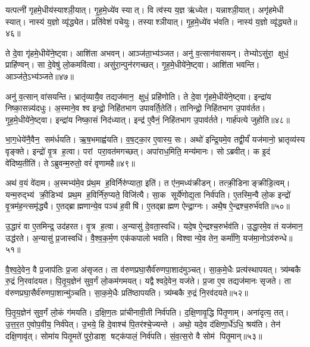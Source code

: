 यत्पत्नी॑ गृहमे॒धीय॑स्याश्ञी॒यात्।
गृ॒ह॒मे॒ध्ये॑व स्यात्।
वि त्व॑स्य य॒ज्ञ ऋ॑ध्येत।
यन्नाश्ञी॒यात्।
अगृ॑हमेधी स्यात्।
नास्य॑ य॒ज्ञो व्यृ॑द्ध्येत।
प्रति॑वेशं पचेयुः।
तस्याश्ञीयात्।
गृ॒ह॒मे॒ध्ये॑व भ॑वति।
नास्य॑ य॒ज्ञो व्यृ॑द्ध्यते॥४६॥

ते दे॒वा गृ॑हमे॒धीये॑ने॒ष्ट्वा।
आशि॑ता अभवन्।
आञ्ज॑ता॒भ्य॑ञ्जत।
अनु॑ व॒त्सान॑वासयन्।
तेभ्योऽसु॑रा॒ क्षुधं॒ प्राहि॑ण्वन्।
सा दे॒वेषु॑ लो॒कमवि॑त्वा।
असु॑रा॒न्पुन॑रगच्छत्।
गृ॒ह॒मे॒धीये॑ने॒ष्ट्वा।
आशि॑ता भवन्ति।
आञ्ज॑ते॒ऽभ्य॑ञ्जते॥४७॥

अनु॑ व॒त्सान् वा॑सयन्ति।
भ्रातृ॑व्यायै॒व तद्यज॑मान॒ क्षुधं॒ प्रहि॑णोति।
ते दे॒वा गृ॑हमे॒धीये॑ने॒ष्ट्वा।
इन्द्रा॑य निष्का॒सन्न्य॑दधुः।
अ॒स्माने॒व श्व इन्द्रो॒ निहि॑तभाग उपावर्ति॒तेति॑।
तानिन्द्रो॒ निहि॑तभाग उ॒पाव॑र्तत।
गृ॒ह॒मे॒धीये॑ने॒ष्ट्वा।
इन्द्रा॑य निष्का॒सं निद॑ध्यात्।
इन्द्र॑ ए॒वैनं॒ निहि॑तभाग उ॒पाव॑र्तते।
गार्\mbox{}ह॑पत्ये जुहोति॥४८॥

भा॒ग॒धेये॑नै॒वैन॒ सम॑र्धयति।
ऋ॒ष॒भमाह्व॑यति।
व॒ष॒ट्का॒र ए॒वास्य॒ सः।
अथो॑ इन्द्रि॒यमे॒व तद्वी॒र्यं॑ यज॑मानो॒ भ्रातृव्य॑स्य वृङ्क्ते।
इन्द्रो॑ वृ॒त्र ह॒त्वा।
परां परा॒वत॑मगच्छत्।
अपा॑राध॒मिति॒ मन्य॑मानः।
सोऽब्रवीत्।
क इ॒दं वे॑दिष्य॒तीति॑।
तेऽब्रुवन्म॒रुतो॒ वरं॑ वृणामहै॥४९॥

अथ॑ व॒यं वे॑दाम।
अ॒स्मभ्य॑मे॒व प्र॑थ॒म ह॒विर्निरु॑प्याता॒ इति॑।
त ए॑न॒मध्य॑क्रीडन्।
तत्क्री॒डिनाङ्क्रीडि॒त्वम्।
यन्म॒रुद्भ्य॑ क्री॒डिभ्य॑ प्रथ॒म ह॒विर्नि॑रु॒प्यते॒ विजि॑त्यै।
सा॒क सूर्ये॑णोद्य॒ता निर्व॑पति।
ए॒तस्मि॒न्वै लो॒क इन्द्रो॑ वृ॒त्रम॑ह॒न्त्समृ॑द्ध्यै।
ए॒तद्ब्राह्मणान्ये॒व पञ्च॑ ह॒वीषि॑।
ए॒तद्ब्राह्मण ऐन्द्रा॒ग्नः।
अथै॒ष ऐ॒न्द्रश्च॒रुर्भ॑वति॥५०॥

उ॒द्धारं वा ए॒तमिन्द्र॒ उद॑हरत।
वृ॒त्र ह॒त्वा।
अ॒न्यासु॑ दे॒वता॒स्वधि॑।
यदे॒ष ऐ॒न्द्रश्च॒रुर्भव॑ति।
उ॒द्धा॒रमे॒व तं यज॑मान॒ उद्ध॑रते।
अ॒न्यासु॑ प्र॒जास्वधि॑।
वै॒श्व॒क॒र्म॒ण एक॑कपालो भवति।
विश्वान्ये॒व तेन॒ कर्मा॑णि॒ यज॑मा॒नोऽव॑रुन्धे॥५१॥\anuvakamend[ऋ॒द्ध्य॒ते॒ऽभ्य॑ञ्जते जुहोति वृणामहै भवत्य॒ष्टौ च॑]

वै॒श्व॒दे॒वेन॒ वै प्र॒जाप॑तिः प्र॒जा अ॑सृजत।
ता व॑रुणप्रघा॒सैर्व॑रुणपा॒शाद॑मुञ्चत्।
सा॒क॒मे॒धैः प्रत्य॑स्थापयत्।
त्र्य॑म्बकै रु॒द्रं नि॒रवा॑दयत।
पि॒तृ॒य॒ज्ञेन॑ सुव॒र्गं लो॒कम॑गमयत्।
यद्वैश्वदे॒वेन॒ यज॑ते।
प्र॒जा ए॒व तद्यज॑मानः सृजते।
ता व॑रुणप्रघा॒सैर्व॑रुणपा॒शान्मु॑ञ्चति।
सा॒क॒मे॒धैः प्रति॑ष्ठापयति।
त्र्य॑म्बकै रु॒द्रं नि॒रव॑दयते॥५२॥

पि॒तृ॒य॒ज्ञेन॑ सुव॒र्गं लो॒कं ग॑मयति।
द॒क्षि॒ण॒तः प्रा॑चीनावी॒ती निर्व॑पति।
द॒क्षि॒णावृ॒द्धि पि॑तृ॒णाम्।
अना॑दृत्य॒ तत्।
उ॒त्त॒र॒त ए॒वोप॒वीय॒ निर्व॑पेत्।
उ॒भये॒ हि दे॒वाश्च॑ पि॒तर॑श्चे॒ज्यन्ते।
अथो॒ यदे॒व द॑क्षिणा॒र्धे॑ऽधि॒ श्रय॑ति।
तेन॑ दक्षि॒णावृ॑त्।
सोमा॑य पितृ॒मते॑ पुरो॒डाश॒ षट्क॑पालं॒ निर्व॑पति।
सं॒व॒त्स॒रो वै सोम॑ पितृ॒मान्॥५३॥

